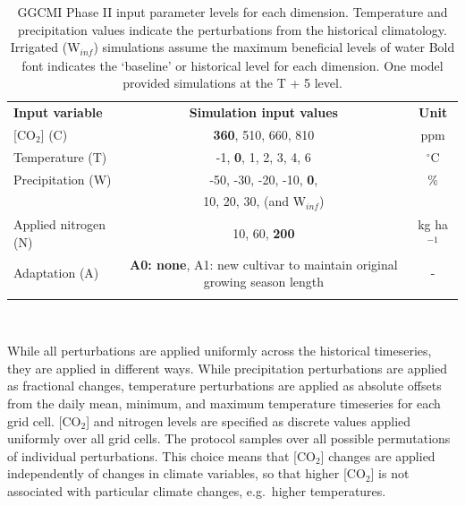 \documentclass[gmd, manuscript]{copernicus} %
\begin{document}
\begin{table}[t]
\caption{GGCMI Phase II input parameter levels for each dimension. Temperature and precipitation values indicate the perturbations from the historical climatology. Irrigated (W$_{\mathit{inf}}$) simulations assume the maximum beneficial levels of water Bold font indicates the `baseline' or historical level for each dimension. One model provided simulations at the T + 5 level.}
\label{table:inputs} 
    \begin{tabular}{lcc} 
        \tophline \vspace{1mm}
        \textbf{Input variable} & \textbf{Simulation input values} & \textbf{Unit} \\ \middlehline \vspace{1mm}
        [CO$_2$] (C) & \textbf{360}, 510, 660, 810 & ppm\\ \middlehline \vspace{1mm}
        Temperature (T) & -1, \textbf{0}, 1, 2, 3, 4, 6 & $^{\circ}$C\\ \middlehline \vspace{1mm}
        Precipitation (W) & -50, -30, -20, -10, \textbf{0}, & \% \\
        {} & 10, 20, 30, (and W$_{\mathit{inf}}$) & {} \\ \middlehline \vspace{1mm}
        Applied nitrogen (N) & 10, 60, \textbf{200} & kg ha$^{-1}$ \\ \middlehline \vspace{1mm}
        Adaptation (A) & \textbf{A0: none}, A1: new cultivar to maintain original growing season length & -\\ \bottomhline
    \end{tabular}\\
\end{table}

While all perturbations are applied uniformly across the historical timeseries, they are applied in different ways. 
While precipitation perturbations are applied as fractional changes, temperature perturbations are applied as absolute offsets from the daily mean, minimum, and maximum temperature timeseries for each grid cell.
[CO$_2$] and nitrogen levels are specified as discrete values applied uniformly over all grid cells. 
The protocol samples over all possible permutations of individual perturbations.
This choice means that [CO$_2$] changes are applied independently of changes in climate variables, so that higher [CO$_2$] is not associated with particular climate changes, e.g.\ higher temperatures. 
\end{document}
